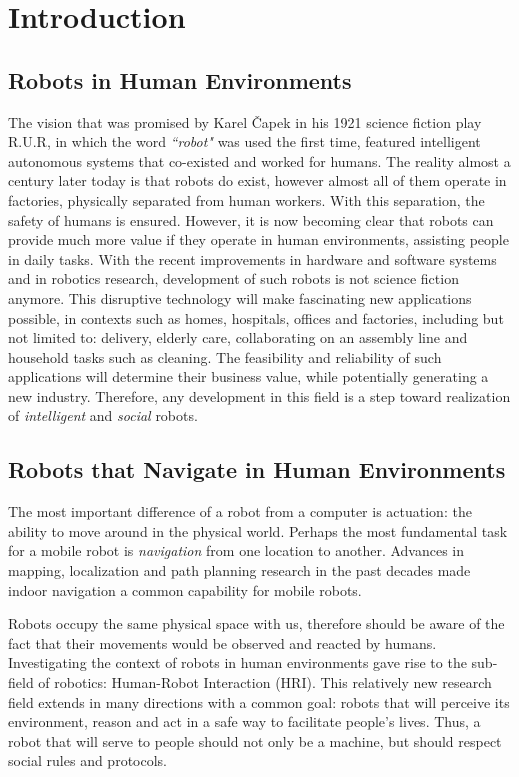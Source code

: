 \chapter{Introduction}
\label{chapter:introduction}

\section{Robots in Human Environments}

The vision that was promised by Karel \v{C}apek in his 1921 science fiction play R.U.R, in which the word \textit{``robot"} was used the first time, featured intelligent autonomous systems that co-existed and worked for humans. The reality almost a century later today is that robots do exist, however almost all of them operate in factories, physically separated from human workers. With this separation, the safety of humans is ensured. However, it is now becoming clear that robots can provide much more value if they operate in human environments, assisting people in daily tasks. With the recent improvements in hardware and software systems and in robotics research, development of such robots is not science fiction anymore. This disruptive technology will make fascinating new applications possible, in contexts such as homes, hospitals, offices and factories, including but not limited to: delivery, elderly care, collaborating on an assembly line and household tasks such as cleaning. The feasibility and reliability of such applications will determine their business value, while potentially generating a new industry. Therefore, any development in this field is a step toward realization of \textit{intelligent} and \textit{social} robots.

\section{Robots that Navigate in Human Environments}

The most important difference of a robot from a computer is actuation: the ability to move around in the physical world. Perhaps the most fundamental task for a mobile robot is \textit{navigation} from one location to another. Advances in mapping, localization and path planning research in the past decades made indoor navigation a common capability for mobile robots. 

Robots occupy the same physical space with us, therefore should be aware of the fact that their movements would be observed and reacted by humans. Investigating the context of robots in human environments gave rise to the sub-field of robotics: Human-Robot Interaction (HRI). This relatively new research field extends in many directions with a common goal: robots that will perceive its environment, reason and act in a safe way to facilitate people's lives. Thus, a robot that will serve to people should not only be a machine, but should respect social rules and protocols.

